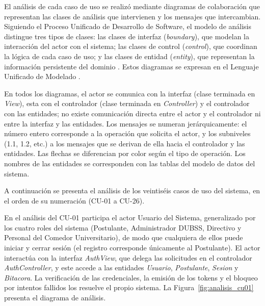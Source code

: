 \label{sec:cap6_analisis_cu}

El análisis de cada caso de uso se realizó mediante diagramas de colaboración que representan las clases de análisis que intervienen y los mensajes que intercambian. Siguiendo el Proceso Unificado de Desarrollo de Software, el modelo de análisis distingue tres tipos de clases: las clases de interfaz (\textit{boundary}), que modelan la interacción del actor con el sistema; las clases de control (\textit{control}), que coordinan la lógica de cada caso de uso; y las clases de entidad (\textit{entity}), que representan la información persistente del dominio \parencite{jacobson1999unified}. Estos diagramas se expresan en el Lenguaje Unificado de Modelado \parencite{booch2005uml}.

En todos los diagramas, el actor se comunica con la interfaz (clase terminada en \textit{View}), esta con el controlador (clase terminada en \textit{Controller}) y el controlador con las entidades; no existe comunicación directa entre el actor y el controlador ni entre la interfaz y las entidades. Los mensajes se numeran jerárquicamente: el número entero corresponde a la operación que solicita el actor, y los subniveles (1.1, 1.2, etc.) a los mensajes que se derivan de ella hacia el controlador y las entidades. Las flechas se diferencian por color según el tipo de operación. Los nombres de las entidades se corresponden con las tablas del modelo de datos del sistema.

A continuación se presenta el análisis de los veintiséis casos de uso del sistema, en el orden de su numeración (CU-01 a CU-26).

\label{sec:cap6_analisis_cu01}

En el análisis del CU-01 participa el actor Usuario del Sistema, generalizado por los cuatro roles del sistema (Postulante, Administrador DUBSS, Directivo y Personal del Comedor Universitario), de modo que cualquiera de ellos puede iniciar y cerrar sesión (el registro corresponde únicamente al Postulante). El actor interactúa con la interfaz \textit{AuthView}, que delega las solicitudes en el controlador \textit{AuthController}, y este accede a las entidades \textit{Usuario}, \textit{Postulante}, \textit{Sesion} y \textit{Bitacora}. La verificación de las credenciales, la emisión de los tokens y el bloqueo por intentos fallidos los resuelve el propio sistema. La Figura~\ref{fig:analisis_cu01} presenta el diagrama de análisis.


